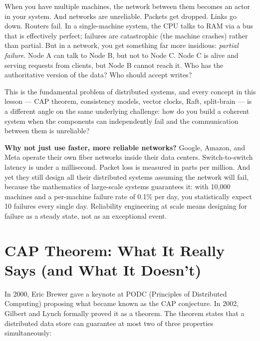 \documentclass[11pt,a4paper]{article}
\begin{document}
When you have multiple machines, the network between them becomes an actor in your system. And networks are unreliable. Packets get dropped. Links go down. Routers fail. In a single-machine system, the CPU talks to RAM via a bus that is effectively perfect; failures are catastrophic (the machine crashes) rather than partial. But in a network, you get something far more insidious: \textit{partial failure}. Node A can talk to Node B, but not to Node C. Node C is alive and serving requests from clients, but Node B cannot reach it. Who has the authoritative version of the data? Who should accept writes?

This is the fundamental problem of distributed systems, and every concept in this lesson --- CAP theorem, consistency models, vector clocks, Raft, split-brain --- is a different angle on the same underlying challenge: how do you build a coherent system when the components can independently fail and the communication between them is unreliable?

\begin{thinkbox}
\textbf{Why not just use faster, more reliable networks?} Google, Amazon, and Meta operate their own fiber networks inside their data centers. Switch-to-switch latency is under a millisecond. Packet loss is measured in parts per million. And yet they still design all their distributed systems assuming the network will fail, because the mathematics of large-scale systems guarantees it: with 10,000 machines and a per-machine failure rate of 0.1\% per day, you statistically expect 10 failures every single day. Reliability engineering at scale means designing for failure as a steady state, not as an exceptional event.
\end{thinkbox}

\section{CAP Theorem: What It Really Says (and What It Doesn't)}

In 2000, Eric Brewer gave a keynote at PODC (Principles of Distributed Computing) proposing what became known as the CAP conjecture. In 2002, Gilbert and Lynch formally proved it as a theorem. The theorem states that a distributed data store can guarantee at most two of three properties simultaneously:
\end{document}
